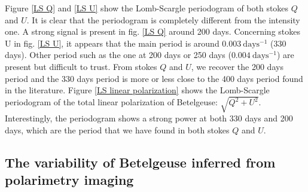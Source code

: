 \documentclass{aa}
\begin{document}
Figure \ref{LS Q} and \ref{LS U} show the Lomb-Scargle periodogram of both stokes $Q$ and $U$. It is clear that the periodogram is completely different 
from the intensity one. A strong signal is present in fig. \ref{LS Q} around 200 days. Concerning stokes U in fig. \ref{LS U}, it appears that the main period is around $0.003 \ \mathrm{days^{-1}}$ (330 days). Other period such as the one at 200 days or 250 days ($0.004 \ \mathrm{days^{-1}}$) are present but difficult to trust. From stokes $Q$ and $U$, we recover the 200 days period and the 330 days period is more or less close to the 400 days period found in the literature. 
Figure \ref{LS linear polarization} shows the Lomb-Scargle periodogram of the total linear polarization of Betelgeuse: $\sqrt{Q^2+U^2}$. 
Interestingly, the periodogram shows a strong power at both 330 days and 200 days, which are the period that we have found in both stokes $Q$ and $U$. 



\subsection{The variability of Betelgeuse inferred from polarimetry imaging}
\end{document}
